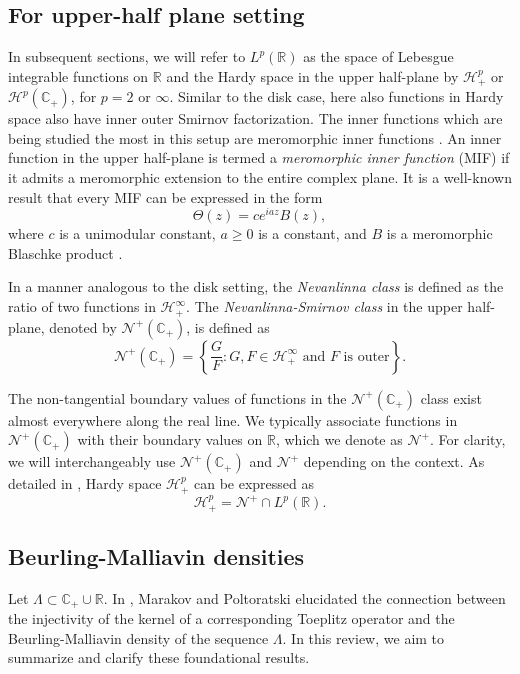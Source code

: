 \documentclass[12pt,a4paper]{amsart}
\begin{document}
\subsection{For upper-half plane setting}
In subsequent sections, we will refer to \( L^p(\mathbb{R}) \) as the space of Lebesgue integrable functions on \( \mathbb{R} \) and  the Hardy space in the upper half-plane by \( \mathcal{H}_+^p \) or \( \mathcal{H}^p(\mathbb{C}_+) \), for \( p = 2 \) or \( \infty \). Similar to the disk case, here also functions in Hardy space also have inner outer Smirnov factorization. The inner functions which  are being studied the most in this setup are meromorphic inner functions \cite{marakov2005}. An inner function in the upper half-plane is termed a \emph{meromorphic inner function }(MIF) if it admits a meromorphic extension to the entire complex plane. It is a well-known result that every MIF can be expressed in the form
\[
\Theta(z) = c e^{iaz} B(z),
\]
where \( c \) is a unimodular constant, \( a \geq 0 \) is a constant, and \( B \) is a meromorphic Blaschke product \cite{marakov2005,Mitkovski2010}.



In a manner analogous to the disk setting, the \emph{Nevanlinna class} is defined as the ratio of two functions in \( \mathcal{H}_+^\infty \). The \emph{Nevanlinna-Smirnov class} in the upper half-plane, denoted by \( \mathcal{N}^+(\mathbb{C}_+) \), is defined as
\[
\mathcal{N}^+(\mathbb{C}_+) = \left\{ \frac{G}{F} : G, F \in \mathcal{H}_+^\infty \text{ and } F \text{ is outer} \right\}.
\]

The non-tangential boundary values of functions in the \( \mathcal{N}^+(\mathbb{C}_+) \) class exist almost everywhere along the real line. We typically associate functions in \( \mathcal{N}^+(\mathbb{C}_+) \) with their boundary values on \( \mathbb{R} \), which we denote as \( \mathcal{N}^+ \). For clarity, we will interchangeably use \( \mathcal{N}^+(\mathbb{C}_+) \) and \( \mathcal{N}^+ \) depending on the context. As detailed in \cite{N2,mashregibook},  Hardy space \( \mathcal{H}_+^p \) can be expressed as
\[
\mathcal{H}_+^p = \mathcal{N}^+ \cap L^p(\mathbb{R}).
\]

\subsection{Beurling-Malliavin densities}

Let \( \Lambda \subset \mathbb{C}_+ \cup \mathbb{R} \). In \cite{marakov2005, marakov2010}, Marakov and Poltoratski elucidated the connection between the injectivity of the kernel of a corresponding Toeplitz operator and the Beurling-Malliavin density of the sequence \( \Lambda \). In this review, we aim to summarize and clarify these foundational results.
\end{document}
